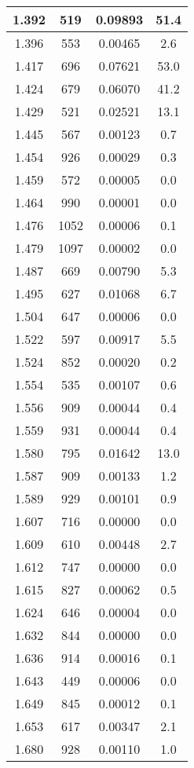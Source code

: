 \begin{longtable}{c | c | c | c}
1.392 &  519 & 0.09893 & 51.4 \\ \hline 
1.396 &  553 & 0.00465 &  2.6 \\ \hline 
1.417 &  696 & 0.07621 & 53.0 \\ \hline 
1.424 &  679 & 0.06070 & 41.2 \\ \hline 
1.429 &  521 & 0.02521 & 13.1 \\ \hline 
1.445 &  567 & 0.00123 &  0.7 \\ \hline 
1.454 &  926 & 0.00029 &  0.3 \\ \hline 
1.459 &  572 & 0.00005 &  0.0 \\ \hline 
1.464 &  990 & 0.00001 &  0.0 \\ \hline 
1.476 & 1052 & 0.00006 &  0.1 \\ \hline 
1.479 & 1097 & 0.00002 &  0.0 \\ \hline 
1.487 &  669 & 0.00790 &  5.3 \\ \hline 
1.495 &  627 & 0.01068 &  6.7 \\ \hline 
1.504 &  647 & 0.00006 &  0.0 \\ \hline 
1.522 &  597 & 0.00917 &  5.5 \\ \hline 
1.524 &  852 & 0.00020 &  0.2 \\ \hline 
1.554 &  535 & 0.00107 &  0.6 \\ \hline 
1.556 &  909 & 0.00044 &  0.4 \\ \hline 
1.559 &  931 & 0.00044 &  0.4 \\ \hline 
1.580 &  795 & 0.01642 & 13.0 \\ \hline 
1.587 &  909 & 0.00133 &  1.2 \\ \hline 
1.589 &  929 & 0.00101 &  0.9 \\ \hline 
1.607 &  716 & 0.00000 &  0.0 \\ \hline 
1.609 &  610 & 0.00448 &  2.7 \\ \hline 
1.612 &  747 & 0.00000 &  0.0 \\ \hline 
1.615 &  827 & 0.00062 &  0.5 \\ \hline 
1.624 &  646 & 0.00004 &  0.0 \\ \hline 
1.632 &  844 & 0.00000 &  0.0 \\ \hline 
1.636 &  914 & 0.00016 &  0.1 \\ \hline 
1.643 &  449 & 0.00006 &  0.0 \\ \hline 
1.649 &  845 & 0.00012 &  0.1 \\ \hline 
1.653 &  617 & 0.00347 &  2.1 \\ \hline 
1.680 &  928 & 0.00110 &  1.0 \\ \hline 

\end{longtable}
